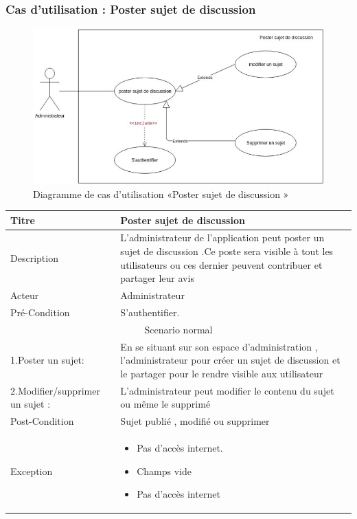 \documentclass[11pt,a4paper,oneside]{book}
\begin{document}
			\subsubsection{Cas d’utilisation : Poster sujet de discussion}
			\begin{figure}[H]
				\centering
				\includegraphics[width=1\textwidth]{Diagrammes/poster_sujet}
				\caption{Diagramme de cas d’utilisation «Poster sujet de discussion »}
				\label{fig:postersujet}
			\end{figure}
			
			\begin{tabular}{ |p{4cm}|p{9cm}|  }
				
				\hline
				Titre&  Poster sujet de discussion\\
				\hline
				Description  & L’administrateur de l’application peut poster un sujet de discussion .Ce poste sera visible à tout les utilisateurs ou ces dernier peuvent contribuer et partager leur avis\\
				\hline
				Acteur& 
				Administrateur
				\\
				\hline
				Pré-Condition & S’authentifier.
				\\
				\hline
				\multicolumn{2}{|c|}{Scenario normal} \\
				\hline
				
				1.Poster un sujet: &En se situant sur son espace d’administration , l’administrateur pour créer un sujet de discussion et le partager pour le rendre visible aux utilisateur \\
				2.Modifier/supprimer un sujet : & L’administrateur peut modifier le contenu du sujet ou même le supprimé \\
				
				\hline
				Post-Condition&Sujet publié , modifié ou supprimer\\
				\hline
				Exception& 
				\begin{itemize}
					\item Pas d’accès internet.
					\item Champs vide
					\item Pas d’accès internet 
				\end{itemize}
			 \\
			 \hline
			\end{tabular}
		
\end{document}
